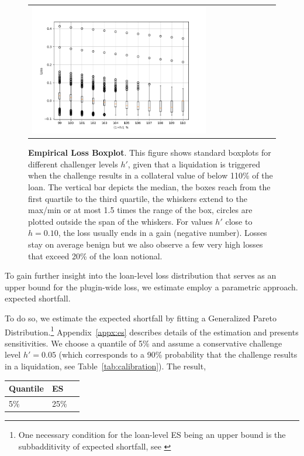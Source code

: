 \documentclass[english,11pt]{article}
\begin{document}
\begin{figure}[h]
    \center
    \begin{tabular}{ll}
    \includegraphics[width=0.75\textwidth]{loss_boxplot.png}
    \end{tabular}
    \caption{\textbf{Empirical Loss Boxplot}. This figure shows standard boxplots for
    different challenger levels $h'$, given that a liquidation is triggered when
    the challenge results in a collateral value of below 110\% of the loan.
    The vertical bar depicts the median, the boxes reach from the first quartile
    to the third quartile, the whiskers extend to the max/min or at most 1.5 times the range of the box,
    circles are plotted outside the span of the whiskers. For values $h'$ close to $h=0.10$,
    the loss usually ends in a gain (negative number). Losses stay on average
    benign but we also observe a few very high losses that exceed
    20\% of the loan notional.}\label{fig:boxplot}
\end{figure}


To gain further insight into the loan-level loss distribution that serves as an upper bound
for the plugin-wide loss, we estimate employ a parametric approach.
expected shortfall.

To do so, we estimate the expected shortfall by fitting a Generalized Pareto 
Distribution.\footnote{One necessary condition for the loan-level ES being an
upper bound is the subbadditivity of expected shortfall, see \cite{artzner1999coherent}}
Appendix~\ref{appx:es} describes details of the estimation and presents sensitivities. 
We choose a quantile of 5\%
and assume a conservative challenge level $h'=0.05$ (which corresponds to a 90\% probability
that the challenge results in a liquidation, see Table~\ref{tab:calibration}).
The result, 

\begin{center}
\begin{tabular}{lll}
\toprule
\textbf{Quantile} & \textbf{ES}   \\
\midrule
5\% & 25\%\\
\bottomrule
\end{tabular}
\end{center}
\end{document}
